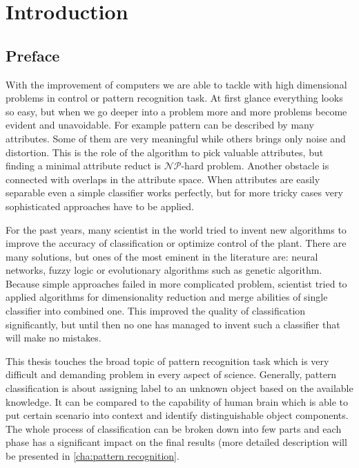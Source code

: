 \section{Introduction}
\subsection{Preface}
\label{cha:Goals}
With the improvement of computers we are able to tackle with high dimensional 
problems in control or pattern recognition task. At first glance everything
looks so easy, but when we go deeper into a problem more and more problems 
become evident and unavoidable. For example pattern can be described by many 
attributes. Some of them are very meaningful while others brings only noise 
and distortion. This is the role of the algorithm to pick valuable attributes,
but finding a minimal attribute reduct is $\mathcal{NP}$-hard problem. Another
obstacle is connected with overlaps in the attribute space. When attributes 
are easily separable even a simple classifier works perfectly, but for more 
tricky cases very sophisticated approaches have to be applied.

For the past years, many scientist in the world tried to invent new algorithms 
to improve the accuracy of classification or optimize control of the plant.
There are many solutions, but ones of the most eminent in the literature are: 
neural networks, fuzzy logic or evolutionary algorithms such as genetic algorithm. 
Because simple approaches failed in more complicated problem, scientist tried to applied 
algorithms for dimensionality reduction and merge abilities of single
classifier into combined one. This improved the quality of classification 
significantly, but until then no one has managed to invent such a classifier 
that will make no mistakes.

This thesis touches the broad topic of pattern recognition task which is 
very difficult and demanding problem in every aspect of science. Generally, 
pattern classification is about assigning label to an unknown object based 
on the available knowledge. It can be compared to the capability of human 
brain which is able to put certain scenario into context and identify 
distinguishable object components. The whole process of classification can 
be broken down into few parts and each phase has a significant impact on the
final results (more detailed description will be presented in \ref{cha:pattern
recognition}.

